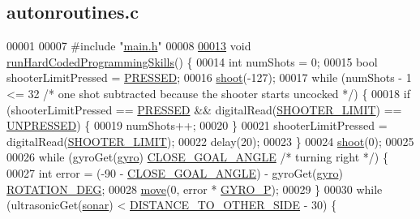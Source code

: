 \hypertarget{autonroutines_8c_source}{}\subsection{autonroutines.\+c}
\label{autonroutines_8c_source}

\begin{DoxyCode}
00001 
00007 \textcolor{preprocessor}{#include "\hyperlink{main_8h}{main.h}"}
00008 
\hypertarget{autonroutines_8c_source.tex_l00013}{}\hyperlink{autonroutines_8h_adfa547bf86c78d482d16cb15a4ddd642}{00013} \textcolor{keywordtype}{void} \hyperlink{autonroutines_8c_adfa547bf86c78d482d16cb15a4ddd642}{runHardCodedProgrammingSkills}() \{
00014     \textcolor{keywordtype}{int} numShots = 0;
00015     \textcolor{keywordtype}{bool} shooterLimitPressed = \hyperlink{friendly_8h_a654adff3c664f27f0b29c24af818dd26}{PRESSED};
00016     \hyperlink{motors_8h_ab183a9a4e6e469515b9f283f7156f843}{shoot}(-127);
00017     \textcolor{keywordflow}{while} (numShots - 1 <= 32 \textcolor{comment}{/* one shot subtracted because the shooter starts uncocked */}) \{
00018         \textcolor{keywordflow}{if} (shooterLimitPressed == \hyperlink{friendly_8h_a654adff3c664f27f0b29c24af818dd26}{PRESSED} && digitalRead(\hyperlink{sensors_8h_a354b5ed50c08708ba703ca9e9121a0cf}{SHOOTER\_LIMIT}) == 
      \hyperlink{friendly_8h_ab165b69b767feb15cba30d2fabcb11cd}{UNPRESSED}) \{
00019             numShots++;
00020         \}
00021         shooterLimitPressed = digitalRead(\hyperlink{sensors_8h_a354b5ed50c08708ba703ca9e9121a0cf}{SHOOTER\_LIMIT});
00022         delay(20);
00023     \}
00024     \hyperlink{motors_8h_ab183a9a4e6e469515b9f283f7156f843}{shoot}(0);
00025 
00026     \textcolor{keywordflow}{while} (gyroGet(\hyperlink{sensors_8c_ad2d059cd4baeedd5fbead13085953eed}{gyro}) %
      \hyperlink{autonroutines_8h_aa165645a0873b1a6d4e2260e31201afe}{CLOSE\_GOAL\_ANGLE} \textcolor{comment}{/* turning right */}) \{
00027         \textcolor{keywordtype}{int} error = (-90 - \hyperlink{autonroutines_8h_aa165645a0873b1a6d4e2260e31201afe}{CLOSE\_GOAL\_ANGLE}) - gyroGet(\hyperlink{sensors_8c_ad2d059cd4baeedd5fbead13085953eed}{gyro}) %
      \hyperlink{constants_8h_af5a74308a3fd418c13af67f9319e5308}{ROTATION\_DEG};
00028         \hyperlink{motors_8h_ae918d6900bfd9ad920597db4f3ff138f}{move}(0, error * \hyperlink{sensors_8h_a5caef30fe7ef36e6f497db8bf9fd9c67}{GYRO\_P});
00029     \}
00030     \textcolor{keywordflow}{while} (ultrasonicGet(\hyperlink{sensors_8c_a09e334aba0637f228c65c135f428606a}{sonar}) < \hyperlink{autonroutines_8h_a2befdcf4842481d11a6058994d8fbef7}{DISTANCE\_TO\_OTHER\_SIDE} - 30) \{

\end{DoxyCode}
